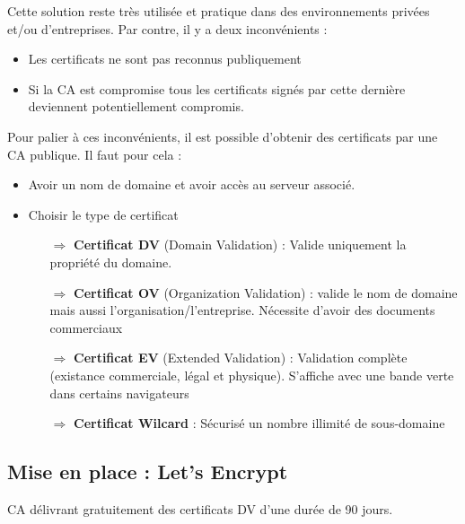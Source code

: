 \documentclass[french, 12pt]{article}%
\newcommand{\itemE}{\item[$\bullet$]}
\newcommand{\titreencadre}{Titre}
\newenvironment{encadre}[1]{\renewcommand{\titreencadre}{#1}
	\begin{mdframed}[style=encadrestyle]
	\vspace{0.5\baselineskip}
	}{%
	\end{mdframed}}
\begin{document}
\vspace{0.5cm}

Cette solution reste très utilisée et pratique dans des environnements privées et/ou d'entreprises. Par contre, il y a deux inconvénients : 
\begin{itemize}
\itemE Les certificats ne sont pas reconnus publiquement
\itemE Si la CA est compromise tous les certificats signés par cette dernière deviennent potentiellement compromis.
\end{itemize}

\vspace{0.25cm}
Pour palier à ces inconvénients, il est possible d'obtenir des certificats par une CA publique. Il faut pour cela :  
\begin{itemize}
\itemE Avoir un nom de domaine et avoir accès au serveur associé.
\itemE Choisir le type de certificat
	\begin{itemize}
	\item[$\Rightarrow$] \textbf{Certificat DV} (Domain Validation) : Valide uniquement la propriété du domaine. 
	\item[$\Rightarrow$] \textbf{Certificat OV} (Organization Validation) : valide le nom de domaine mais aussi l'organisation/l'entreprise. Nécessite d'avoir des documents commerciaux
	\item[$\Rightarrow$] \textbf{Certificat EV} (Extended Validation) : Validation complète (existance commerciale, légal et physique). S'affiche avec une bande verte dans certains navigateurs
	\item[$\Rightarrow$] \textbf{Certificat Wilcard} : Sécurisé un nombre illimité de sous-domaine
	\end{itemize}
\end{itemize}

\subsection{Mise en place : Let's Encrypt}

\begin{encadre}{Let's encrypt}
CA délivrant gratuitement des certificats DV d’une durée de 90 jours.
\end{encadre}
\end{document}
